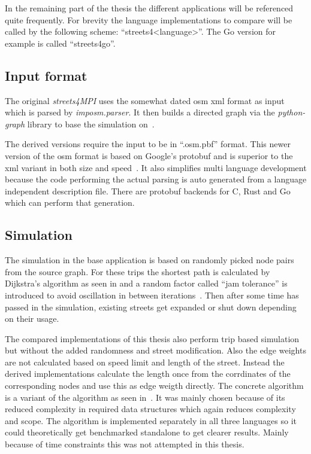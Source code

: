In the remaining part of the thesis the different applications will be referenced quite frequently. For brevity the language implementations to compare will be called by the following scheme: ``streets4<language>''. The Go version for example is called ``streets4go''.

\subsection*{Input format}
\label{subsec:Approach::Differences::Input}

The original \textit{streets4MPI} uses the somewhat dated \gls{osm} \gls{xml} format as input which is parsed by \textit{imposm.parser}. It then builds a directed graph via the \textit{python-graph} library to base the simulation on~\cite{streets_report}.

The derived versions require the input to be in ``.osm.pbf'' format. This newer version of the \gls{osm} format is based on Google's \gls{protobuf} and is superior to the \gls{xml} variant in both size and speed~\cite{osm_wiki_pbf}. It also simplifies multi language development because the code performing the actual parsing is auto generated from a language independent description file. There are \gls{protobuf} backends for C, Rust and Go which can perform that generation.

\subsection*{Simulation}
\label{subsec:Approach::Differences::Simulation}

The simulation in the base application is based on randomly picked node pairs from the source graph. For these trips the shortest path is calculated by Dijkstra's algorithm as seen in \cite{cormen} and a random factor called ``jam tolerance'' is introduced to avoid oscillation in between iterations~\cite{streets_report}. Then after some time has passed in the simulation, existing streets get expanded or shut down depending on their usage.

The compared implementations of this thesis also perform trip based simulation but without the added randomness and street modification. Also the edge weights are not calculated based on speed limit and length of the street. Instead the derived implementations calculate the length once from the corrdinates of the corresponding nodes and use this as edge weigth directly. The concrete algorithm is a variant of the  algorithm as seen in~\cite[p. 16]{dijkstra_utcs}. It was mainly chosen because of its reduced complexity in required data structures which again reduces complexity and scope. The algorithm is implemented separately in all three languages so it could theoretically get benchmarked standalone to get clearer results. Mainly because of time constraints this was not attempted in this thesis.

